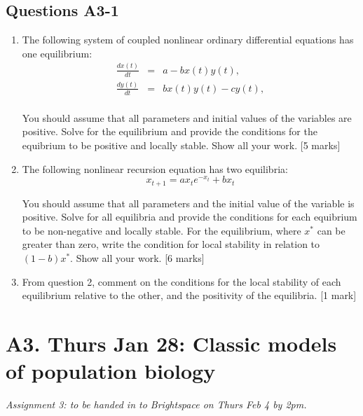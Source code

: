 \documentclass[]{book}
\begin{document}
\section{Questions A3-1}\label{questions-a3-1}

\begin{enumerate}
\def\labelenumi{\arabic{enumi}.}
\item
  The following system of coupled nonlinear ordinary differential
  equations has one equilibrium:\\

  \begin{eqnarray}
  \frac{dx(t)}{dt} & = & a - bx(t)y(t),\\
  \frac{dy(t)}{dt} & = & bx(t)y(t) - cy(t),\\
  \end{eqnarray}

  You should assume that all parameters and initial values of the
  variables are positive. Solve for the equilibrium and provide the
  conditions for the equibrium to be positive and locally stable. Show
  all your work. {[}5 marks{]}\\
\item
  The following nonlinear recursion equation has two equilibria:\\

  \begin{equation}
  x_{t+1} = a x_t e^{-x_t}+bx_t
  \end{equation}

  You should assume that all parameters and the initial value of the
  variable is positive. Solve for all equilibria and provide the
  conditions for each equibrium to be non-negative and locally stable.
  For the equilibrium, where \(x^*\) can be greater than zero, write the
  condition for local stability in relation to \((1-b)x^*\). Show all
  your work. {[}6 marks{]}
\item
  From question 2, comment on the conditions for the local stability of
  each equilibrium relative to the other, and the positivity of the
  equilibria. {[}1 mark{]}
\end{enumerate}

\chapter{A3. Thurs Jan 28: Classic models of population
biology}\label{a3.-thurs-jan-28-classic-models-of-population-biology}

\emph{Assignment 3: to be handed in to Brightspace on Thurs Feb 4 by
2pm.}
\end{document}
